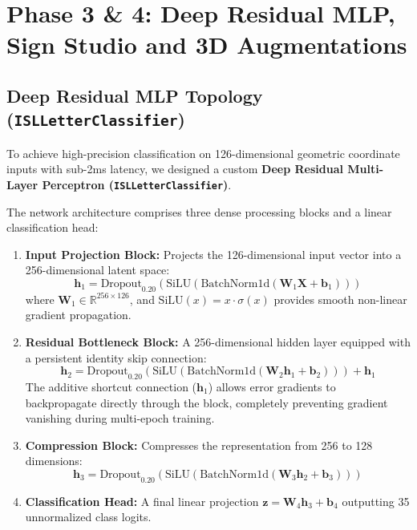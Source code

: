 \chapter{Phase 3 \& 4: Deep Residual MLP, Sign Studio and 3D Augmentations}
\label{Chapter 4}

\section{Deep Residual MLP Topology (\texttt{ISLLetterClassifier})}
To achieve high-precision classification on 126-dimensional geometric coordinate inputs with sub-2ms latency, we designed a custom \textbf{Deep Residual Multi-Layer Perceptron (\texttt{ISLLetterClassifier})}.

The network architecture comprises three dense processing blocks and a linear classification head:
\begin{enumerate}
    \item \textbf{Input Projection Block:} Projects the 126-dimensional input vector into a 256-dimensional latent space:
    \begin{equation}
        \mathbf{h}_1 = \text{Dropout}_{0.20}\left(\text{SiLU}\left(\text{BatchNorm1d}\left(\mathbf{W}_1 \mathbf{X} + \mathbf{b}_1\right)\right)\right)
    \end{equation}
    where $\mathbf{W}_1 \in \mathbb{R}^{256 \times 126}$, and $\text{SiLU}(x) = x \cdot \sigma(x)$ provides smooth non-linear gradient propagation.
    \item \textbf{Residual Bottleneck Block:} A 256-dimensional hidden layer equipped with a persistent identity skip connection:
    \begin{equation}
        \mathbf{h}_2 = \text{Dropout}_{0.20}\left(\text{SiLU}\left(\text{BatchNorm1d}\left(\mathbf{W}_2 \mathbf{h}_1 + \mathbf{b}_2\right)\right)\right) + \mathbf{h}_1
    \end{equation}
    The additive shortcut connection ($\mathbf{h}_1$) allows error gradients to backpropagate directly through the block, completely preventing gradient vanishing during multi-epoch training.
    \item \textbf{Compression Block:} Compresses the representation from 256 to 128 dimensions:
    \begin{equation}
        \mathbf{h}_3 = \text{Dropout}_{0.20}\left(\text{SiLU}\left(\text{BatchNorm1d}\left(\mathbf{W}_3 \mathbf{h}_2 + \mathbf{b}_3\right)\right)\right)
    \end{equation}
    \item \textbf{Classification Head:} A final linear projection $\mathbf{z} = \mathbf{W}_4 \mathbf{h}_3 + \mathbf{b}_4$ outputting 35 unnormalized class logits.
\end{enumerate}

